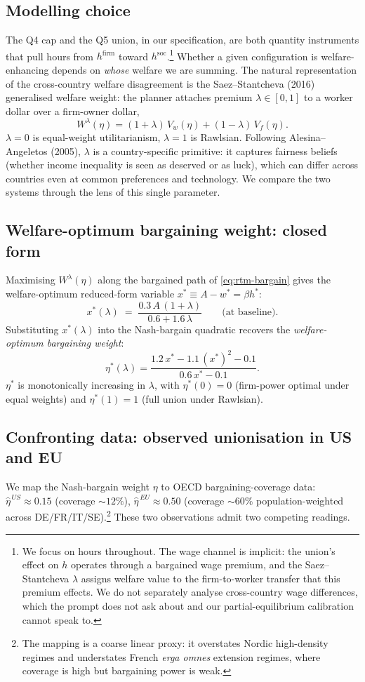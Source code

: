\documentclass[a4paper,11pt]{article}
\begin{document}
\subsection{Modelling choice}
The Q4 cap and the Q5 union, in our specification, are both quantity instruments that pull hours from $h^{\mathrm{firm}}$ toward $h^{\mathrm{soc}}$.\footnote{We focus on hours throughout. The wage channel is implicit: the union's effect on $h$ operates through a bargained wage premium, and the Saez--Stantcheva $\lambda$ assigns welfare value to the firm-to-worker transfer that this premium effects. We do not separately analyse cross-country wage differences, which the prompt does not ask about and our partial-equilibrium calibration cannot speak to.} Whether a given configuration is welfare-enhancing depends on \emph{whose} welfare we are summing. The natural representation of the cross-country welfare disagreement is the Saez--Stantcheva (2016) generalised welfare weight: the planner attaches premium $\lambda\!\in\![0,1]$ to a worker dollar over a firm-owner dollar,
\[
W^{\lambda}(\eta) = (1+\lambda)\,V_w(\eta) + (1-\lambda)\,V_f(\eta).
\]
$\lambda\!=\!0$ is equal-weight utilitarianism, $\lambda\!=\!1$ is Rawlsian. Following Alesina--Angeletos (2005), $\lambda$ is a country-specific primitive: it captures fairness beliefs (whether income inequality is seen as deserved or as luck), which can differ across countries even at common preferences and technology. We compare the two systems through the lens of this single parameter.

\subsection{Welfare-optimum bargaining weight: closed form}
Maximising $W^{\lambda}(\eta)$ along the bargained path of \eqref{eq:rtm-bargain} gives the welfare-optimum reduced-form variable $x^{*}\!\equiv\!A-w^{*}\!=\!\beta h^{*}$:
\[
x^{*}(\lambda)\;=\;\frac{0.3\,A\,(1+\lambda)}{0.6+1.6\,\lambda}\qquad\text{(at baseline)}.
\]
Substituting $x^{*}(\lambda)$ into the Nash-bargain quadratic recovers the \emph{welfare-optimum bargaining weight}:
\[
\eta^{*}(\lambda) = \frac{1.2\,x^{*}-1.1\,(x^{*})^{2}-0.1}{0.6\,x^{*}-0.1}.
\]
$\eta^{*}$ is monotonically increasing in $\lambda$, with $\eta^{*}(0)\!=\!0$ (firm-power optimal under equal weights) and $\eta^{*}(1)\!=\!1$ (full union under Rawlsian).

\subsection{Confronting data: observed unionisation in US and EU}
We map the Nash-bargain weight $\eta$ to OECD bargaining-coverage data: $\hat\eta^{\,US}\!\approx\!0.15$ (coverage $\sim\!12\%$), $\hat\eta^{\,EU}\!\approx\!0.50$ (coverage $\sim\!60\%$ population-weighted across DE/FR/IT/SE).\footnote{The mapping is a coarse linear proxy: it overstates Nordic high-density regimes and understates French \emph{erga omnes} extension regimes, where coverage is high but bargaining power is weak.} These two observations admit two competing readings.
\end{document}
